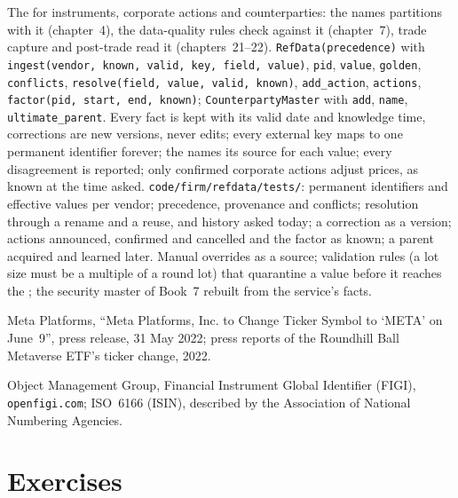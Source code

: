 \begin{build}
 The  for instruments, corporate actions and counterparties: the  names partitions with
it (chapter~4), the data-quality rules check against it (chapter~7), trade capture and post-trade read it (chapters~21--22).
 \texttt{RefData(precedence)} with \texttt{ingest(vendor, known, valid, key, field, value)}, \texttt{pid},
\texttt{value}, \texttt{golden}, \texttt{conflicts}, \texttt{resolve(field, value, valid, known)}, \texttt{add\_action},
\texttt{actions}, \texttt{factor(pid, start, end, known)}; \texttt{CounterpartyMaster} with \texttt{add}, \texttt{name},
\texttt{ultimate\_parent}.
 Every fact is kept with its valid date and knowledge time, corrections are new versions, never edits; every
external key maps to one permanent identifier forever; the  names its source for each value; every disagreement is
reported; only confirmed corporate actions adjust prices, as known at the time asked.
 \texttt{code/firm/refdata/tests/}: permanent identifiers and effective values per vendor; precedence,
provenance and conflicts; resolution through a rename and a reuse, and history asked today; a correction as a version; actions
announced, confirmed and cancelled and the factor as known; a parent acquired and learned later.
 Manual overrides as a source; validation rules (a lot size must be a multiple of a round lot) that quarantine a
value before it reaches the ; the security master of Book~7 rebuilt from the service's facts.
\end{build}

\begin{omsources}
\item Meta Platforms, ``Meta Platforms, Inc. to Change Ticker Symbol to `META' on June~9'', press release, 31 May 2022; press
reports of the Roundhill Ball Metaverse ETF's ticker change, 2022.
\item Object Management Group, Financial Instrument Global Identifier (FIGI), \texttt{openfigi.com}; ISO~6166 (ISIN), described by
the Association of National Numbering Agencies.
\end{omsources}

\section{Exercises}

